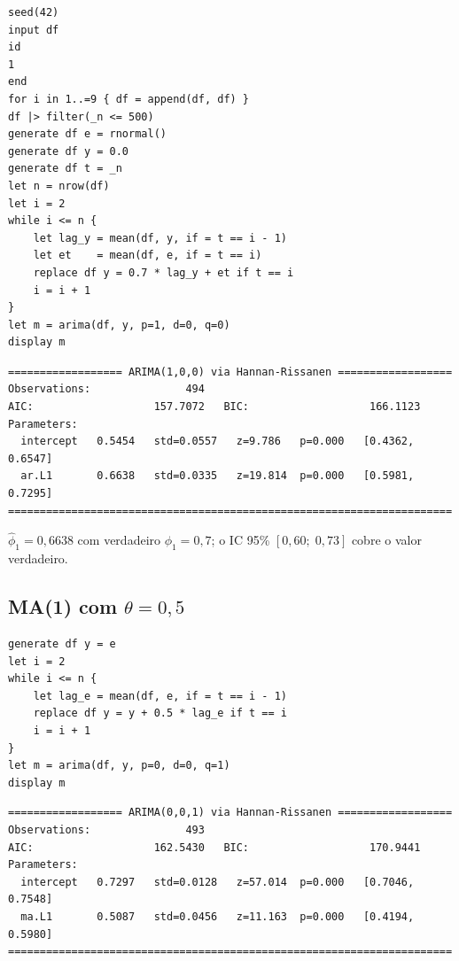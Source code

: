 \begin{lstlisting}[caption={DGP AR(1) e estimação}]
seed(42)
input df
id
1
end
for i in 1..=9 { df = append(df, df) }
df |> filter(_n <= 500)
generate df e = rnormal()
generate df y = 0.0
generate df t = _n
let n = nrow(df)
let i = 2
while i <= n {
    let lag_y = mean(df, y, if = t == i - 1)
    let et    = mean(df, e, if = t == i)
    replace df y = 0.7 * lag_y + et if t == i
    i = i + 1
}
let m = arima(df, y, p=1, d=0, q=0)
display m
\end{lstlisting}

\begin{lstlisting}[language={}, basicstyle=\ttfamily\small,
  frame=none, numbers=none, backgroundcolor=\color{codbg},
  xleftmargin=0pt, xrightmargin=0pt, breaklines=false]
================== ARIMA(1,0,0) via Hannan-Rissanen ==================
Observations:               494
AIC:                   157.7072   BIC:                   166.1123
Parameters:
  intercept   0.5454   std=0.0557   z=9.786   p=0.000   [0.4362, 0.6547]
  ar.L1       0.6638   std=0.0335   z=19.814  p=0.000   [0.5981, 0.7295]
======================================================================
\end{lstlisting}

$\hat\phi_1 = 0{,}6638$ com verdadeiro $\phi_1 = 0{,}7$; o IC 95\% $[0{,}60;\;
0{,}73]$ cobre o valor verdadeiro.

\subsection*{MA(1) com $\theta = 0{,}5$}

\begin{lstlisting}[caption={DGP MA(1) e estimação}]
generate df y = e
let i = 2
while i <= n {
    let lag_e = mean(df, e, if = t == i - 1)
    replace df y = y + 0.5 * lag_e if t == i
    i = i + 1
}
let m = arima(df, y, p=0, d=0, q=1)
display m
\end{lstlisting}

\begin{lstlisting}[language={}, basicstyle=\ttfamily\small,
  frame=none, numbers=none, backgroundcolor=\color{codbg},
  xleftmargin=0pt, xrightmargin=0pt, breaklines=false]
================== ARIMA(0,0,1) via Hannan-Rissanen ==================
Observations:               493
AIC:                   162.5430   BIC:                   170.9441
Parameters:
  intercept   0.7297   std=0.0128   z=57.014  p=0.000   [0.7046, 0.7548]
  ma.L1       0.5087   std=0.0456   z=11.163  p=0.000   [0.4194, 0.5980]
======================================================================
\end{lstlisting}


